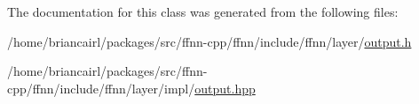 The documentation for this class was generated from the following files\-:\begin{DoxyCompactItemize}
\item 
/home/briancairl/packages/src/ffnn-\/cpp/ffnn/include/ffnn/layer/\hyperlink{output_8h}{output.\-h}\item 
/home/briancairl/packages/src/ffnn-\/cpp/ffnn/include/ffnn/layer/impl/\hyperlink{output_8hpp}{output.\-hpp}\end{DoxyCompactItemize}
